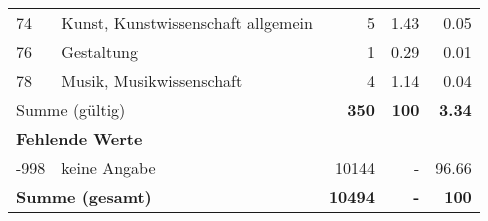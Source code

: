 \begin{longtable}{lXrrr}
        74 & \multicolumn{1}{X}{Kunst, Kunstwissenschaft allgemein} & %
          \num{5} &
          \num[round-mode=places,round-precision=2]{1.43} &
          \num[round-mode=places,round-precision=2]{0.05} \\

        76 & \multicolumn{1}{X}{Gestaltung} & %
          \num{1} &
          \num[round-mode=places,round-precision=2]{0.29} &
          \num[round-mode=places,round-precision=2]{0.01} \\

        78 & \multicolumn{1}{X}{Musik, Musikwissenschaft} & %
          \num{4} &
          \num[round-mode=places,round-precision=2]{1.14} &
          \num[round-mode=places,round-precision=2]{0.04} \\

     \midrule
     \multicolumn{2}{l}{Summe (gültig)} &
       \textbf{\num{350}} &
     \textbf{\num{100}} &
       \textbf{\num[round-mode=places,round-precision=2]{3.34}} \\
     \multicolumn{5}{l}{\textbf{Fehlende Werte}}\\
       -998 &
       keine Angabe &
         \num{10144} &
        - &
         \num[round-mode=places,round-precision=2]{96.66} \\
     \midrule
     \multicolumn{2}{l}{\textbf{Summe (gesamt)}} &
          \textbf{\num{10494}} &
        \textbf{-} &
        \textbf{\num{100}} \\
     \bottomrule
     \end{longtable}
     
